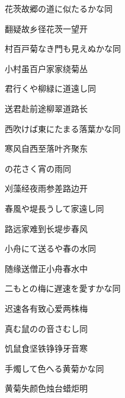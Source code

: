 \begin{haiku}
    {\FH 花茨故郷の道に似たるかな}\hfill{\FH 同}

    {\FK 翻疑故乡径花茨一望开}
\end{haiku}

\begin{haiku}
    {\FH 村百戸菊なき門も見えぬかな}\hfill{\FH 同}

    {\FK 小村虽百户家家绕菊丛}
\end{haiku}

\begin{haiku}
    {\FH 君行くや柳緑に道遠し}\hfill{\FH 同}

    {\FK 送君赴前途柳翠道路长}
\end{haiku}

\begin{haiku}
    {\FH 西吹けば東にたまる落葉かな}\hfill{\FH 同}

    {\FK 寒风自西至落叶齐聚东}
\end{haiku}

\begin{haiku}
    {\FH {}の花さく宵の雨}\hfill{\FH 同}

    {\FK 刈藻经夜雨参差路边开}
\end{haiku}

\begin{haiku}
    {\FH 春風や堤長うして家遠し}\hfill{\FH 同}

    {\FK 路远家难到长堤步春风}
\end{haiku}

\begin{haiku}
    {\FH 小舟にて送るや春の水}\hfill{\FH 同}

    {\FK 随缘送僧正小舟春水中}
\end{haiku}

\begin{haiku}
    {\FH 二もとの梅に遅速を愛すかな}\hfill{\FH 同}

    {\FK 迟速各有致心爱两株梅}
\end{haiku}

\begin{haiku}
    {\FH 真む鼠のの音さむし}\hfill{\FH 同}

    {\FK 饥鼠食坚铁铮铮牙音寒}
\end{haiku}

\begin{haiku}
    {\FH 手燭して色へる黄菊かな}\hfill{\FH 同}

    {\FK 黄菊失颜色烛台蜡炬明}
\end{haiku}

